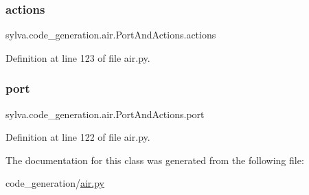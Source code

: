 \subsubsection{\texorpdfstring{actions}{actions}}
{\footnotesize\ttfamily sylva.\+code\+\_\+generation.\+air.\+Port\+And\+Actions.\+actions}



Definition at line 123 of file air.\+py.

\mbox{\label{classsylva_1_1code__generation_1_1air_1_1_port_and_actions_a6b5a21780c1b3cc8879c05a5dfdd65bf}} 
\subsubsection{\texorpdfstring{port}{port}}
{\footnotesize\ttfamily sylva.\+code\+\_\+generation.\+air.\+Port\+And\+Actions.\+port}



Definition at line 122 of file air.\+py.



The documentation for this class was generated from the following file\+:\begin{DoxyCompactItemize}
\item 
code\+\_\+generation/\hyperlink{air_8py}{air.\+py}\end{DoxyCompactItemize}

